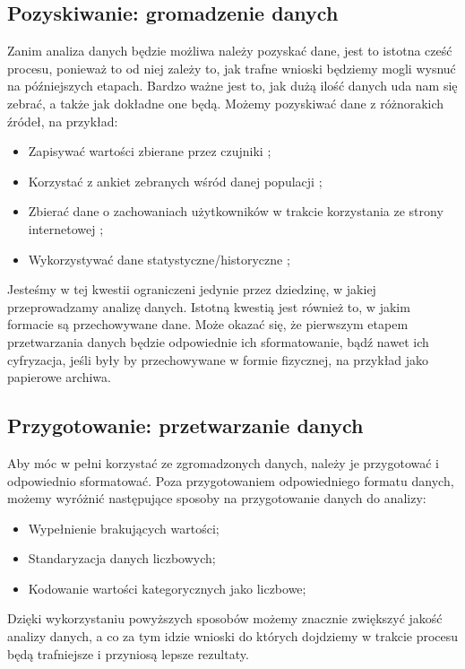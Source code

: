 \documentclass[oneside]{book}
\begin{document}
\subsection*{Pozyskiwanie: gromadzenie danych}
Zanim analiza danych będzie możliwa należy pozyskać dane, 
jest to istotna cześć procesu, ponieważ to od niej zależy to, 
jak trafne wnioski będziemy mogli wysnuć na późniejszych etapach.
Bardzo ważne jest to, jak dużą ilość danych uda nam się zebrać, 
a także jak dokładne one będą.
Możemy pozyskiwać dane z różnorakich źródeł, na przykład: 
\begin{itemize}
    \item Zapisywać wartości zbierane przez czujniki \cite{data_from_sensors};
    \item Korzystać z ankiet zebranych wśród danej populacji \cite{data_from_questionaire};
    \item Zbierać dane o zachowaniach użytkowników w trakcie korzystania ze strony internetowej \cite{data_from_behavior};
    \item Wykorzystywać dane statystyczne/historyczne \cite{data_from_statistics};
  \end{itemize}
Jesteśmy w tej kwestii ograniczeni jedynie przez dziedzinę, 
w jakiej przeprowadzamy analizę danych.
Istotną kwestią jest również to, w jakim formacie są 
przechowywane dane. Może okazać się, że pierwszym etapem przetwarzania danych 
będzie odpowiednie ich sformatowanie, bądź nawet ich cyfryzacja, jeśli były 
by przechowywane w formie fizycznej, na przykład jako papierowe archiwa.


\subsection*{Przygotowanie: przetwarzanie danych}
Aby móc w pełni korzystać ze zgromadzonych danych, 
należy je przygotować i odpowiednio sformatować. 
Poza przygotowaniem odpowiedniego formatu danych, 
możemy wyróżnić następujące sposoby na przygotowanie danych do analizy:
\begin{itemize}
    \item Wypełnienie brakujących wartości;
    \item Standaryzacja danych liczbowych;
    \item Kodowanie wartości kategorycznych jako liczbowe;
  \end{itemize}
Dzięki wykorzystaniu powyższych sposobów możemy 
znacznie zwiększyć jakość analizy danych, 
a co za tym idzie wnioski do których dojdziemy w trakcie procesu będą 
trafniejsze i przyniosą lepsze rezultaty.
\end{document}
